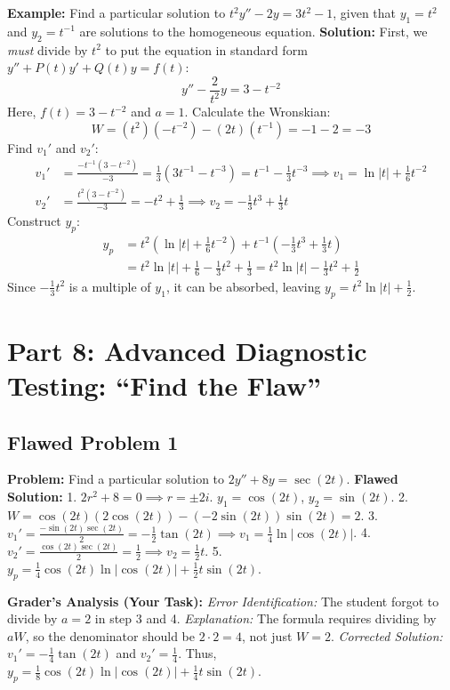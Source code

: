\documentclass{article}
\begin{document}
\textbf{Example:} Find a particular solution to $t^2 y'' - 2y = 3t^2 - 1$, given that $y_1 = t^2$ and $y_2 = t^{-1}$ are solutions to the homogeneous equation.
\textbf{Solution:}
First, we \textit{must} divide by $t^2$ to put the equation in standard form $y'' + P(t)y' + Q(t)y = f(t)$:
\[ y'' - \frac{2}{t^2} y = 3 - t^{-2} \]
Here, $f(t) = 3 - t^{-2}$ and $a = 1$.
Calculate the Wronskian:
\[ W = (t^2)(-t^{-2}) - (2t)(t^{-1}) = -1 - 2 = -3 \]
Find $v_1'$ and $v_2'$:
\begin{align*}
v_1' &= \frac{-t^{-1}(3 - t^{-2})}{-3} = \frac{1}{3}(3t^{-1} - t^{-3}) = t^{-1} - \frac{1}{3}t^{-3} \implies v_1 = \ln|t| + \frac{1}{6}t^{-2} \\
v_2' &= \frac{t^2(3 - t^{-2})}{-3} = -t^2 + \frac{1}{3} \implies v_2 = -\frac{1}{3}t^3 + \frac{1}{3}t
\end{align*}
Construct $y_p$:
\begin{align*}
y_p &= t^2 \left( \ln|t| + \frac{1}{6}t^{-2} \right) + t^{-1} \left( -\frac{1}{3}t^3 + \frac{1}{3}t \right) \\
&= t^2 \ln|t| + \frac{1}{6} - \frac{1}{3}t^2 + \frac{1}{3} = t^2 \ln|t| - \frac{1}{3}t^2 + \frac{1}{2}
\end{align*}
Since $-\frac{1}{3}t^2$ is a multiple of $y_1$, it can be absorbed, leaving $y_p = t^2 \ln|t| + \frac{1}{2}$.

\section{Part 8: Advanced Diagnostic Testing: ``Find the Flaw''}

\subsection{Flawed Problem 1}
\textbf{Problem:} Find a particular solution to $2y'' + 8y = \sec(2t)$.
\textbf{Flawed Solution:}
1. $2r^2 + 8 = 0 \implies r = \pm 2i$. $y_1 = \cos(2t)$, $y_2 = \sin(2t)$.
2. $W = \cos(2t)(2\cos(2t)) - (-2\sin(2t))\sin(2t) = 2$.
3. $v_1' = \frac{-\sin(2t) \sec(2t)}{2} = -\frac{1}{2} \tan(2t) \implies v_1 = \frac{1}{4} \ln\left|\cos(2t)\right|$.
4. $v_2' = \frac{\cos(2t) \sec(2t)}{2} = \frac{1}{2} \implies v_2 = \frac{1}{2} t$.
5. $y_p = \frac{1}{4} \cos(2t) \ln\left|\cos(2t)\right| + \frac{1}{2} t \sin(2t)$.

\textbf{Grader's Analysis (Your Task):}
\textit{Error Identification:} The student forgot to divide by $a=2$ in step 3 and 4.
\textit{Explanation:} The formula requires dividing by $aW$, so the denominator should be $2 \cdot 2 = 4$, not just $W=2$.
\textit{Corrected Solution:} $v_1' = -\frac{1}{4} \tan(2t)$ and $v_2' = \frac{1}{4}$. Thus, $y_p = \frac{1}{8} \cos(2t) \ln\left|\cos(2t)\right| + \frac{1}{4} t \sin(2t)$.
\end{document}
